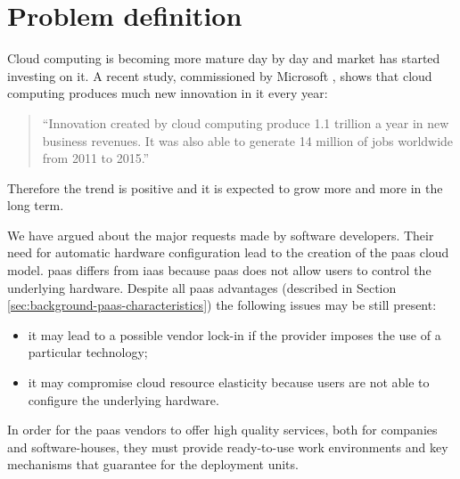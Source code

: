 %
%
\section{Problem definition}
\label{sec:background-problem}
Cloud computing is becoming more mature day by day and market has started investing on it. A recent
study, commissioned by Microsoft \cite{microsftCloudNewJob}, shows that cloud computing produces much
new innovation in \acs{it} every year:

\begin{center}
	\begin{quote}
		``Innovation created by cloud computing produce \textdollar{}1.1 trillion a year in new
		business revenues. It was also able to generate 14 million of jobs worldwide from 2011 to 2015.''
	\end{quote}
\end{center}

Therefore the trend is positive and it is expected to grow more and more in the long term.

We have argued about the major requests made by software developers. Their need for automatic
hardware configuration lead to the creation of the \ac{paas} cloud model. \ac{paas} differs from
\ac{iaas} because \ac{paas} does not allow users to control the underlying hardware. Despite all
\ac{paas} advantages (described in Section \ref{sec:background-paas-characteristics})
the following issues may be still present:

\begin{itemize}
	\item{it may lead to a possible vendor lock-in if the provider imposes the use of a particular
		technology;}
	\item{it may compromise cloud resource elasticity because users are not able to configure the
		underlying hardware.}
\end{itemize}

In order for the \ac{paas} vendors to offer high quality services, both for companies and software-houses,
they must provide ready-to-use work environments and key mechanisms that guarantee 
for the deployment units.

